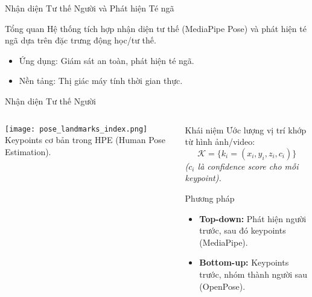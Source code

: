 
\begin{frame}{Nhận diện Tư thế Người và Phát hiện Té ngã}
    \begin{block}{Tổng quan}
        Hệ thống tích hợp nhận diện tư thế (MediaPipe Pose) và phát hiện té ngã dựa trên đặc trưng động học/tư thế.
        \begin{itemize}
            \item Ứng dụng: Giám sát an toàn, phát hiện té ngã.
            \item Nền tảng: Thị giác máy tính thời gian thực.
        \end{itemize}
    \end{block}
\end{frame}

\begin{frame}{Nhận diện Tư thế Người}
\begin{columns}[T]
    \begin{column}{0.45\textwidth}
        \centering
        \texttt{[image: pose\_landmarks\_index.png]}
        \vspace{0.2cm}
        {\small Keypoints cơ bản trong HPE (Human Pose Estimation).}
    \end{column}

    \begin{column}{0.55\textwidth}
        \begin{block}{Khái niệm}
            Ước lượng vị trí khớp từ hình ảnh/video:
            \[
                \mathcal{K} = \{k_i = (x_i, y_i, z_i, c_i)\}
            \]
            \small{\textit{($c_i$ là confidence score cho mỗi keypoint).}}
        \end{block}

        \begin{alertblock}{Phương pháp}
            \begin{itemize}
                \item \textbf{Top-down:} Phát hiện người trước, sau đó keypoints (MediaPipe).
                \item \textbf{Bottom-up:} Keypoints trước, nhóm thành người sau (OpenPose).
            \end{itemize}
        \end{alertblock}
    \end{column}
\end{columns}
\end{frame}

